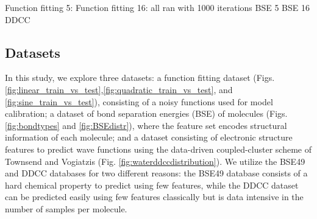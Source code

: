 \documentclass[journal=jacsat,manuscript=article]{achemso}
\begin{document}
Function fitting 5: 
Function fitting 16: all ran with 1000 iterations
BSE 5
BSE 16
DDCC

\subsection{Datasets}\label{subsection:datasets}
In this study, we explore three datasets: a function fitting dataset (Figs. \ref{fig:linear_train_vs_test},\ref{fig:quadratic_train_vs_test}, and \ref{fig:sine_train_vs_test}), consisting of a noisy functions used for model calibration; a dataset of bond separation energies (BSE) of molecules (Figs. \ref{fig:bondtypes} and \ref{fig:BSEdistr}), where the feature set encodes structural information of each molecule;
and a dataset consisting of electronic structure features to predict wave functions using the data-driven coupled-cluster scheme of Townsend and Vogiatzis (Fig. \ref{fig:waterddccdistribution}).\cite{townsend_data-driven_2019}
We utilize the BSE49 and DDCC databases for two different reasons: the BSE49 database consists of a hard chemical property to predict using few features, while the DDCC dataset can be predicted easily using few features classically but is data intensive in the number of samples per molecule.
\end{document}

